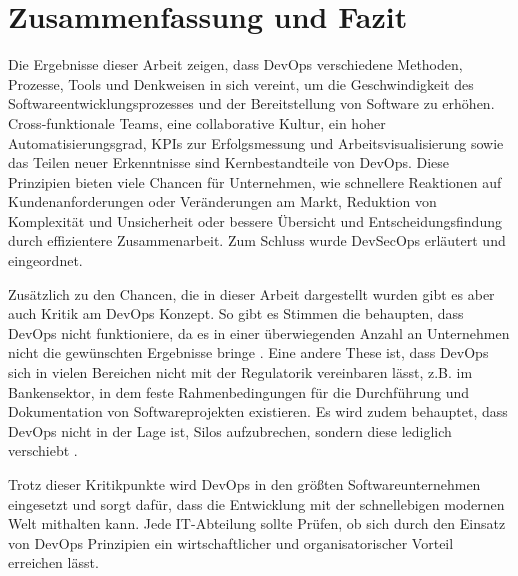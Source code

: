\section{Zusammenfassung und Fazit}

Die Ergebnisse dieser Arbeit zeigen, dass DevOps verschiedene
Methoden, Prozesse, Tools und Denkweisen in sich vereint, um
die Geschwindigkeit des Softwareentwicklungsprozesses 
und der Bereitstellung von Software zu erhöhen.
Cross-funktionale Teams, eine collaborative Kultur,
ein hoher Automatisierungsgrad, KPIs zur Erfolgsmessung und
Arbeitsvisualisierung sowie das Teilen neuer Erkenntnisse sind
Kernbestandteile von DevOps.
Diese Prinzipien bieten viele Chancen für Unternehmen, wie
schnellere Reaktionen auf Kundenanforderungen oder Veränderungen
am Markt, Reduktion von Komplexität und Unsicherheit oder
bessere Übersicht und Entscheidungsfindung durch effizientere
Zusammenarbeit. Zum Schluss wurde DevSecOps erläutert und eingeordnet.

Zusätzlich zu den Chancen, die in dieser Arbeit dargestellt wurden
gibt es aber auch Kritik am DevOps Konzept.
So gibt es Stimmen die behaupten, dass DevOps nicht funktioniere,
da es in einer überwiegenden Anzahl an Unternehmen nicht die gewünschten
Ergebnisse bringe \cite{Halstenberg2020}.
Eine andere These ist, dass DevOps sich in vielen Bereichen nicht mit der
Regulatorik vereinbaren lässt, z.B. im Bankensektor, in dem feste Rahmenbedingungen
für die Durchführung und Dokumentation von Softwareprojekten existieren.
Es wird zudem behauptet, dass DevOps nicht in der Lage ist, Silos aufzubrechen, sondern
diese lediglich verschiebt \cite{Halstenberg2020}.

Trotz dieser Kritikpunkte wird DevOps in den größten Softwareunternehmen eingesetzt
und sorgt dafür, dass die Entwicklung mit der schnellebigen modernen Welt mithalten
kann. Jede IT-Abteilung sollte Prüfen, ob sich durch den Einsatz von DevOps Prinzipien
ein wirtschaftlicher und organisatorischer Vorteil erreichen lässt.


